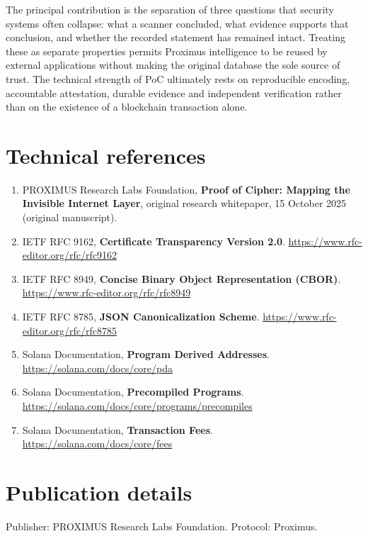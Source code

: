 \documentclass[10pt,a4paper]{article}
\begin{document}
The principal contribution is the separation of three questions that security systems often collapse: what a scanner concluded, what evidence supports that conclusion, and whether the recorded statement has remained intact. Treating these as separate properties permits Proximus intelligence to be reused by external applications without making the original database the sole source of trust. The technical strength of PoC ultimately rests on reproducible encoding, accountable attestation, durable evidence and independent verification rather than on the existence of a blockchain transaction alone.


\section*{Technical references}
\begin{enumerate}
\item PROXIMUS Research Labs Foundation, \textbf{Proof of Cipher: Mapping the Invisible Internet Layer}, original research whitepaper, 15 October 2025 (original manuscript).
\item IETF RFC 9162, \textbf{Certificate Transparency Version 2.0}. \href{https://www.rfc-editor.org/rfc/rfc9162}{https://www.rfc-editor.org/rfc/rfc9162}
\item IETF RFC 8949, \textbf{Concise Binary Object Representation (CBOR)}. \href{https://www.rfc-editor.org/rfc/rfc8949}{https://www.rfc-editor.org/rfc/rfc8949}
\item IETF RFC 8785, \textbf{JSON Canonicalization Scheme}. \href{https://www.rfc-editor.org/rfc/rfc8785}{https://www.rfc-editor.org/rfc/rfc8785}
\item Solana Documentation, \textbf{Program Derived Addresses}. \href{https://solana.com/docs/core/pda}{https://solana.com/docs/core/pda}
\item Solana Documentation, \textbf{Precompiled Programs}. \href{https://solana.com/docs/core/programs/precompiles}{https://solana.com/docs/core/programs/precompiles}
\item Solana Documentation, \textbf{Transaction Fees}. \href{https://solana.com/docs/core/fees}{https://solana.com/docs/core/fees}
\end{enumerate}

\section*{Publication details}
Publisher: PROXIMUS Research Labs Foundation. Protocol: Proximus.
\end{document}

